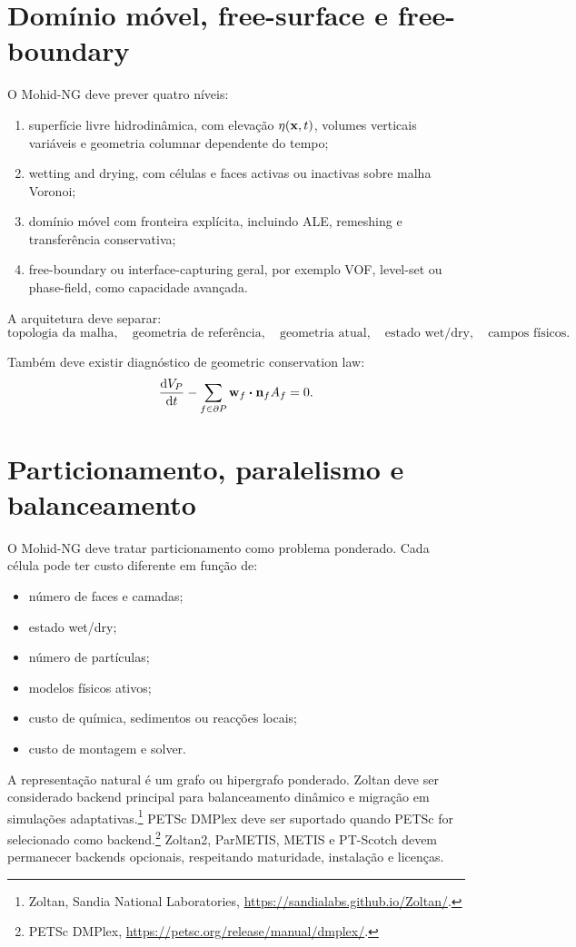 \documentclass[11pt,a4paper]{article}
\begin{document}
\section{Dom\'inio m\'ovel, free-surface e free-boundary}

O Mohid-NG deve prever quatro n\'iveis:
\begin{enumerate}
  \item superf\'icie livre hidrodin\^amica, com eleva\c{c}\~ao \(\eta(\vb{x},t)\), volumes verticais vari\'aveis e geometria columnar dependente do tempo;
  \item wetting and drying, com c\'elulas e faces activas ou inactivas sobre malha Voronoi;
  \item dom\'inio m\'ovel com fronteira expl\'icita, incluindo ALE, remeshing e transfer\^encia conservativa;
  \item free-boundary ou interface-capturing geral, por exemplo VOF, level-set ou phase-field, como capacidade avan\c{c}ada.
\end{enumerate}

A arquitetura deve separar:
\[
\text{topologia da malha},\quad
\text{geometria de refer\^encia},\quad
\text{geometria atual},\quad
\text{estado wet/dry},\quad
\text{campos f\'isicos}.
\]

Tamb\'em deve existir diagn\'ostico de geometric conservation law:
\[
\dv{V_P}{t}-\sum_{f\in\partial P}\vb{w}_f\vdot\vb{n}_fA_f=0.
\]

\section{Particionamento, paralelismo e balanceamento}

O Mohid-NG deve tratar particionamento como problema ponderado. Cada c\'elula pode ter custo diferente em fun\c{c}\~ao de:
\begin{itemize}
  \item n\'umero de faces e camadas;
  \item estado wet/dry;
  \item n\'umero de part\'iculas;
  \item modelos f\'isicos ativos;
  \item custo de qu\'imica, sedimentos ou reac\c{c}\~oes locais;
  \item custo de montagem e solver.
\end{itemize}

A representa\c{c}\~ao natural \'e um grafo ou hipergrafo ponderado. Zoltan deve ser considerado backend principal para balanceamento din\^amico e migra\c{c}\~ao em simula\c{c}\~oes adaptativas.\footnote{Zoltan, Sandia National Laboratories, \url{https://sandialabs.github.io/Zoltan/}.} PETSc DMPlex deve ser suportado quando PETSc for selecionado como backend.\footnote{PETSc DMPlex, \url{https://petsc.org/release/manual/dmplex/}.} Zoltan2, ParMETIS, METIS e PT-Scotch devem permanecer backends opcionais, respeitando maturidade, instala\c{c}\~ao e licen\c{c}as.
\end{document}

